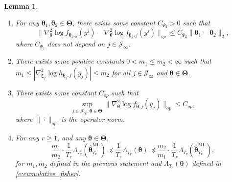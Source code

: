 \documentclass[10pt,a4paper]{amsart}
\newtheorem{lemma}{Lemma}
\newcommand{\bfTheta}{\boldsymbol{\Theta}}
\newcommand{\bftheta}{\boldsymbol{\theta}}
\newcommand{\bfxi}{\boldsymbol{\xi}}
\begin{document}
\begin{lemma}
\begin{enumerate}
{\begin{equation*}
\end{equation*}
where $C_{\Psi_1}$ does not depend on $j \in \mathcal{J}_{\infty}$.}
\item{For any $\bftheta_1, \bftheta_2 \in \bfTheta$, there exists some constant $C_{\Psi_2} > 0$ such that 
\begin{equation*}
\| \nabla_{\bftheta}^2 \log f_{\bftheta_1, j}(y^j) - \nabla_{\bftheta}^2 \log f_{\bftheta_2, j}(y^j) \|_{op} \leq C_{\Psi_2} \| \bftheta_1 - \bftheta_2 \|_2,
\end{equation*}
where $C_{\Psi_2}$ does not depend on $j \in \mathcal{J}_{\infty}$.}
\item{There exists some positive constants $0 < m_1 \le m_2 < \infty$ such that $m_1 \leq | \nabla_{\bfxi_j}^2 \log h_{\bfxi_j, j}(y_j)| \leq m_2$ for all $j \in\mathcal{J}_{\infty}$ and $\bftheta \in \bfTheta$.}
\item{There exists some constant $C_{op}$ such that 
\begin{equation*}
\sup_{j \in \mathcal{J}_{\infty}, \bftheta \in \bfTheta} \| \nabla_{\bftheta}^2 \log f_{\bftheta, j}(y_j) \|_{op} \le C_{op},
\end{equation*}
where $\| \cdot \|_{op}$ is the operator norm.}
\item{For any $r \geq 1$, and any $\bftheta \in \bfTheta$,
\begin{equation*}
\frac{m_1}{m_2} \cdot \frac{1}{T_r} \Lambda_{T_r}(  \hat{\bftheta}_{T_r}^{\mathrm{ML}} ) \preceq 
\frac{1}{T_r} \Lambda_{T_r}(  \bftheta ) 
\preceq
\frac{m_2}{m_1} \cdot \frac{1}{T_r} \Lambda_{T_r}( \hat{\bftheta}_{T_r}^{\mathrm{ML}}  ),
\end{equation*}
for $m_1, m_2$ defined in the previous statement and $\Lambda_{T_r}( \bftheta )$ defined in \eqref{e:cumulative_fisher}.}
\end{enumerate}
\end{lemma}
\end{document}
